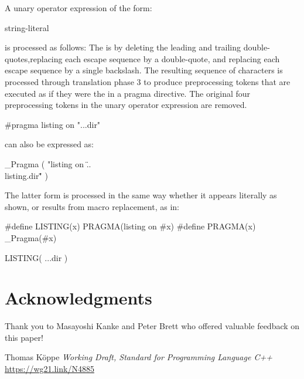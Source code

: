 \documentclass{wg21}
\begin{document}
\pnum
A unary operator expression of the form:

\begin{ncbnf}
     \terminal{(} string-literal \terminal{)}
\end{ncbnf}

is processed as follows: The 
is  by
 deleting the leading and trailing
double-quotes,replacing each escape sequence  by a double-quote, and
replacing each escape sequence \tcode{\textbackslash\textbackslash} by a single
backslash. The resulting sequence of characters is processed through translation phase 3
to produce preprocessing tokens that are executed as if they were the
 in a pragma directive. The original four preprocessing
tokens in the unary operator expression are removed.

\pnum
\begin{example}
\begin{codeblock}
    #pragma listing on "..\listing.dir"
\end{codeblock}
can also be expressed as:
\begin{codeblock}
    _Pragma ( "listing on \"..\\listing.dir\"" )
\end{codeblock}
The latter form is processed in the same way whether it appears literally
as shown, or results from macro replacement, as in:
\begin{codeblock}
    #define LISTING(x) PRAGMA(listing on #x)
    #define PRAGMA(x) _Pragma(#x)

    LISTING( ..\listing.dir )
\end{codeblock}
\end{example}


\section{Acknowledgments}

Thank you to Masayoshi Kanke and Peter Brett who offered valuable feedback on this paper!






\renewcommand{\section}[2]{}%
\begin{thebibliography}{9}

Thomas Köppe
\emph{Working Draft, Standard for Programming Language C++}\newline
\url{https://wg21.link/N4885}

\end{thebibliography}
\end{document}
